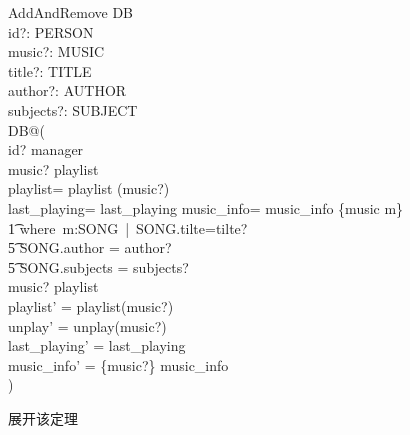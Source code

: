 \documentclass[14pt]{article}
\numberwithin{figure}{subsection}
\begin{document}
\begin{schema}{AddAndRemove}
    \Delta DB\\
    id?: PERSON\\
    music?: MUSIC\\
    title?: TITLE\\
    author?: AUTHOR\\
    subjects?: SUBJECT\\
    \where
    \exists DB\plus @(\\
    id? \in manager\\
    music? \not \in playlist\\
    playlist\plus = playlist \cup (music?)\\
    last\_playing\plus = last\_playing
    music\_info\oplus = music\_info \oplus \{music \mapsto m\}\\
    \t1 where\ m:SONG\ |\ SONG.tilte=tilte?\\
    \t5 \quad SONG.author = author?\\
    \t5 \quad SONG.subjects = subjects?\\
    music? \in playlist\plus \\
    playlist' = playlist\plus \setminus (music?)\\
    unplay' = unplay\plus \setminus (music?)\\
    last\_playing' = last\_playing\plus \\
    music\_info' = \{music?\} \ndres music\_info\plus\\
    )
\end{schema}
展开该定理
\end{document}

